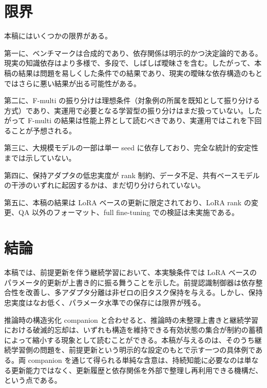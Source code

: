 \documentclass[12pt,a4paper]{article}
\begin{document}
\section{限界}\label{ux9650ux754c}

本稿にはいくつかの限界がある。

第一に、ベンチマークは合成的であり、依存関係は明示的かつ決定論的である。現実の知識依存はより多様で、多段で、しばしば曖昧さを含む。したがって、本稿の結果は問題を易しくした条件での結果であり、現実の曖昧な依存構造のもとではさらに悪い結果が出る可能性がある。

第二に、F-multi の振り分けは理想条件（対象例の所属を既知として振り分ける方式）であり、実運用で必要となる学習型の振り分けはまだ扱っていない。したがって F-multi の結果は性能上界として読むべきであり、実運用ではこれを下回ることが予想される。

第三に、大規模モデルの一部は単一 seed に依存しており、完全な統計的安定性までは示していない。

第四に、保持アダプタの低忠実度が rank 制約、データ不足、共有ベースモデルの干渉のいずれに起因するかは、まだ切り分けられていない。

第五に、本稿の結果は LoRA ベースの更新に限定されており、LoRA rank の変更、QA 以外のフォーマット、full fine-tuning での検証は未実施である。

\section{結論}\label{ux7d50ux8ad6}

本稿では、前提更新を伴う継続学習において、本実験条件では LoRA ベースのパラメータ的更新が上書き的に振る舞うことを示した。前提認識制御器は依存整合性を改善し、多アダプタ分離は非ゼロの旧タスク保持を与える。しかし、保持忠実度はなお低く、パラメータ水準での保存には限界が残る。

推論時の構造劣化 companion と合わせると、推論時の未整理上書きと継続学習における破滅的忘却は、いずれも構造を維持できる有効状態の集合が制約の蓄積によって縮小する現象として読むことができる。本稿が与えるのは、そのうち継続学習側の問題を、前提更新という明示的な設定のもとで示す一つの具体例である。両 companion を通じて得られる単純な含意は、持続知能に必要なのは単なる更新能力ではなく、更新履歴と依存関係を外部で整理し再利用できる機構だ、という点である。
\end{document}
